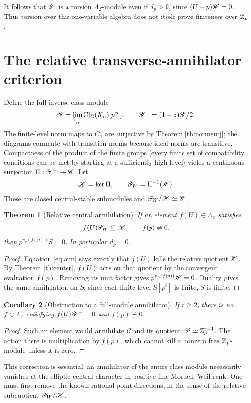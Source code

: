 \documentclass[11pt,a4paper]{article}
\newtheorem{theorem}{Theorem}[section]
\newtheorem{corollary}[theorem]{Corollary}
\theoremstyle{definition}\newtheorem{definition}[theorem]{Definition}
\theoremstyle{remark}\newtheorem{remark}[theorem]{Remark}
\numberwithin{equation}{section}
\begin{document}
It follows that $\mathscr W$ is a torsion $\Lambda_Z$-module even if $d_p>0$, since $(U-p)\mathscr W=0$. Thus torsion over this one-variable algebra does not itself prove finiteness over $\mathbb Z_p$.


\section{The relative transverse-annihilator criterion}\label{sec:ann}
Define the full inverse class module
\[
\mathscr Y=\varprojlim_n\operatorname{Cl}_\Sigma(K_n)[p^\infty],\qquad
\mathscr Y^-=(1-z)\mathscr Y/2.
\]
The finite-level norm maps to $C_n$ are surjective by Theorem \ref{th:normsurj}; the diagrams commute with transition norms because ideal norms are transitive. Compactness of the product of the finite groups (every finite set of compatibility conditions can be met by starting at a sufficiently high level) yields a continuous surjection $\Pi:\mathscr Y^-\twoheadrightarrow\mathscr C$. Let
\[
\mathscr K=\ker\Pi,\qquad \mathscr Y_W=\Pi^{-1}(\mathscr W).
\]
These are closed central-stable submodules and $\mathscr Y_W/\mathscr K\simeq\mathscr W$.
\begin{theorem}[Relative central annihilation]\label{th:ann}
If an element $f(U)\in\Lambda_Z$ satisfies
\begin{equation}\label{eq:ann}
f(U)\mathscr Y_W\subseteq\mathscr K,\qquad f(p)\ne0,
\end{equation}
then $p^{v_p(f(p))}S=0$. In particular $d_p=0$.
\end{theorem}
\begin{proof}
Equation \eqref{eq:ann} says exactly that $f(U)$ kills the relative quotient $\mathscr W$. By Theorem \ref{th:center}, $f(U)$ acts on that quotient by the convergent evaluation $f(p)$. Removing its unit factor gives $p^{v_p(f(p))}\mathscr W=0$. Duality gives the same annihilation on $S$; since each finite-level $S[p^b]$ is finite, $S$ is finite.\end{proof}
\begin{corollary}[Obstruction to a full-module annihilator]
If $r\ge2$, there is no $f\in\Lambda_Z$ satisfying $f(U)\mathscr Y^-=0$ and $f(p)\ne0$.
\end{corollary}
\begin{proof}
Such an element would annihilate $\mathscr C$ and its quotient $\mathscr P\simeq\mathbb Z_p^{r-1}$. The action there is multiplication by $f(p)$, which cannot kill a nonzero free $\mathbb Z_p$-module unless it is zero.\end{proof}
This correction is essential: an annihilator of the entire class module necessarily vanishes at the elliptic central character in positive fine Mordell--Weil rank. One must first remove the known rational-point directions, in the sense of the relative subquotient $\mathscr Y_W/\mathscr K$.
\end{document}

